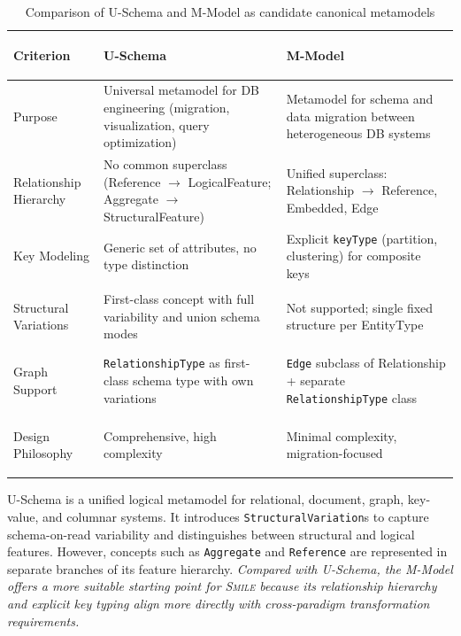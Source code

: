 \documentclass{llncs}
\begin{document}
\begin{table}[h!]
  \centering
  \caption{Comparison of U-Schema and M-Model as candidate canonical metamodels}
  \label{tab:metamodel-comparison-rw}
  \renewcommand{\arraystretch}{1.25}
  \begin{tabular}{@{}
    >{\bfseries\raggedright\arraybackslash}p{2.2cm}
    >{\raggedright\arraybackslash}p{4.8cm}
    >{\raggedright\arraybackslash}p{4.8cm}
  @{}}
  \toprule
  \rowcolor{gray!15}
  \textbf{Criterion} &
  \textbf{U-Schema}~\cite{candel2022unified} &
  \textbf{M-Model}~\cite{conrad2022metamodels} \\
  \midrule
  Purpose &
  Universal metamodel for DB engineering (migration, visualization, query optimization) &
  Metamodel for schema and data migration between heterogeneous DB systems \\
  \addlinespace
  Relationship Hierarchy &
  No common superclass (Reference $\to$ LogicalFeature; Aggregate $\to$ StructuralFeature) &
  Unified superclass: Relationship $\to$ Reference, Embedded, Edge \\
  \addlinespace
  Key Modeling &
  Generic set of attributes, no type distinction &
  Explicit \texttt{keyType} (partition, clustering) for composite keys \\
  \addlinespace
  Structural Variations &
  First-class concept with full variability and union schema modes &
  Not supported; single fixed structure per EntityType \\
  \addlinespace
  Graph Support &
  \texttt{RelationshipType} as first-class schema type with own variations &
  \texttt{Edge} subclass of Relationship + separate \texttt{RelationshipType} class \\
  \addlinespace
  Design Philosophy &
  Comprehensive, high complexity &
  Minimal complexity, migration-focused \\
  \bottomrule
  \end{tabular}
\end{table}


U-Schema is a unified logical metamodel for relational, document, graph, key-value, and columnar systems. It introduces \texttt{StructuralVariation}s to capture schema-on-read variability and distinguishes between structural and logical features. However, concepts such as \texttt{Aggregate} and \texttt{Reference} are represented in separate branches of its feature hierarchy. \textit{Compared with U-Schema, the M-Model offers a more suitable starting point for \textsc{Smile} because its relationship hierarchy and explicit key typing align more directly with cross-paradigm transformation requirements.
}
\end{document}

